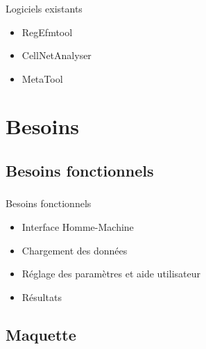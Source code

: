 \documentclass[11pt]{beamer}
\begin{document}
\begin{frame}
	\frametitle{\secname}
	\begin{block}{Logiciels existants}
		\begin{itemize}
		\item RegEfmtool
		\item CellNetAnalyser
		\item MetaTool
		\end{itemize}
	\end{block}
\end{frame}

\section{Besoins	}	

\subsection{Besoins fonctionnels}

\begin{frame}
	\frametitle{\subsecname}
	\begin{block}{Besoins fonctionnels}
		\begin{itemize}
		\item Interface Homme-Machine
		\item Chargement des données
		\item Réglage des paramètres et aide utilisateur
		\item Résultats
		\end{itemize}
	\end{block}
\end{frame}

\subsection{Maquette}
\end{document}
